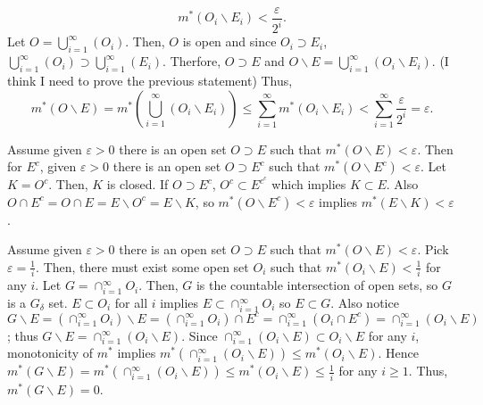 \begin{enumerate}
\begin{pf}
\[
m^{*}(O_i \backslash E_i) < \frac{\varepsilon}{2^i}.
\] 
Let $O=\bigcup_{i=1}^\infty(O_i)$. Then, $O$ is open and since $O_i \supset E_i$, $\bigcup_{i=1}^\infty(O_i)\supset \bigcup_{i=1}^\infty(E_i)$. Therfore, $O\supset E$ and $O \backslash E=\bigcup_{i=1}^\infty(O_i\backslash E_i)$. (I think I need to prove the previous statement) Thus, \[
m^{*}(O \backslash E)=m^{*}\left(\bigcup_{i=1}^\infty(O_i\backslash E_i)\right)\leq \sum_{i=1}^\infty m^{*}(O_i \backslash E_i)< \sum_{i=1}^\infty\frac{\varepsilon}{2^i}=\varepsilon. 
\]
\end{pf}
\begin{pf}
Assume given $\varepsilon>0$ there is an open set $O \supset E$ such that $m^*(O\backslash E)<\varepsilon$. Then for $E^c$, given $\varepsilon>0$ there is an open set $O \supset E^c$ such that $m^*(O\backslash E^c)<\varepsilon$. Let $K=O^c$. Then, $K$ is closed. If $O \supset E^c$, $O^c \subset E^{c^c}$ which implies $K \subset E$. Also $O \cap E^c= O \cap E= E\backslash O^c = E\backslash K$, so $m^*(O\backslash E^c)<\varepsilon$ implies $m^{*}(E \backslash K)<\varepsilon$. 
\end{pf}

\begin{pf}
	Assume given $\varepsilon>0$ there is an open set $O \supset E$ such that $m^*(O\backslash E)<\varepsilon$. Pick $\varepsilon=\frac{1}{i}$. Then, there must exist some open set $O_i$ such that $m^{*}(O_i \backslash E) < \frac{1}{i}$ for any $i$. Let $G = \cap_{i=1}^\infty O_i$. Then, $G$ is the countable intersection of open sets, so $G$ is a $G_\delta$ set. $E \subset O_i$ for all $i$ implies $E \subset \cap_{i=1}^\infty O_i$ so $E \subset G$. Also notice $G \backslash E = (\cap_{i=1}^\infty O_i)\backslash E=(\cap_{i=1}^\infty O_i)\cap E^c=\cap_{i=1}^\infty (O_i\cap E^c)= \cap_{i=1}^\infty (O_i\backslash E)$; thus $G \backslash E = \cap_{i=1}^\infty (O_i\backslash E)$. Since $\cap_{i=1}^\infty (O_i\backslash E)\subset O_i \backslash E$ for any $i$, monotonicity of $m^{*}$ implies $m^{*}(\cap_{i=1}^\infty (O_i\backslash E)) \leq m^{*}(O_i \backslash E)$. Hence $m^{*}(G \backslash E) = m^{*}(\cap_{i=1}^\infty (O_i\backslash E))\leq  m^{*}(O_i \backslash E) \leq \frac{1}{i}$ for any $i \geq 1$. Thus,  $m^{*}(G \backslash E) = 0$. 
\end{pf}


\end{enumerate}
